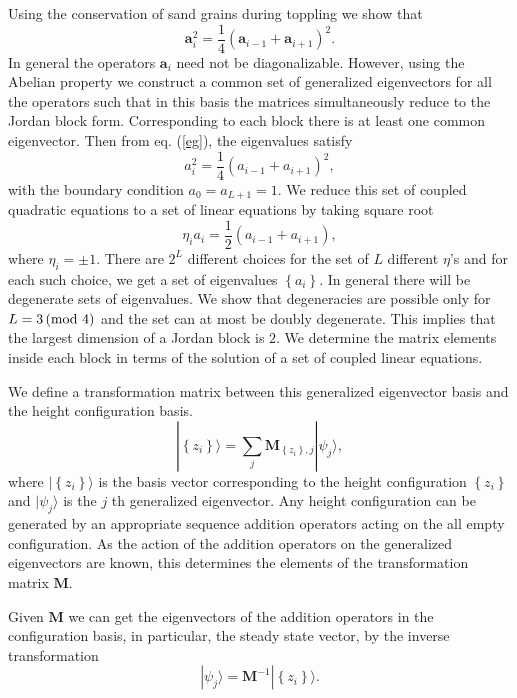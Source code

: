 \documentclass[11pt,a4paper]{book}
\begin{document}
Using the conservation of sand grains during toppling we show that
\begin{equation}
\mathbf{a}_{i}^{2}=\frac{1}{4}\left(
\mathbf{a}_{i-1}+\mathbf{a}_{i+1} \right)^{2}.
\label{eg}
\end{equation}
In general the operators $\mathbf{a}_{i}$ need not be diagonalizable.
However, using the Abelian property we construct a common set of
generalized eigenvectors for all the operators such that in this basis the
matrices simultaneously reduce to the Jordan block form. Corresponding to
each block there is at least one common eigenvector. Then from
eq. (\ref{eg}), the eigenvalues satisfy
\begin{equation}
a_{i}^{2}=\frac{1}{4}\left( a_{i-1} +
a_{i+1}\right)^{2},
\end{equation}
with the boundary condition $a_{0}=a_{L+1}=1$. We reduce this set of
coupled quadratic equations to a
set of linear equations by taking square root
\begin{equation}
\eta_{i}a_{i}=\frac{1}{2}\left( a_{i-1}+a_{i+1} \right),
\end{equation}
where $\eta_{i}=\pm 1$. There are $2^{L}$ different choices for the
set of $L$ different $\eta$'s and for each such choice, we get a set
of eigenvalues $\left\{ a_{i} \right\}$. In general there will be
degenerate sets of eigenvalues. We show that degeneracies are possible
only for $L= 3 \left(\rm{mod ~} 4 \right)$ and the set can at most be doubly
degenerate. This implies that the largest dimension of a Jordan
block is $2$. We determine the matrix elements inside each block in
terms of the solution of a set of coupled linear equations.

We define a transformation matrix between this generalized
eigenvector basis and the height configuration
basis.
\begin{equation}
|\left\{ z_{i} \right\}\rangle = \sum_{j} \mathbf{M}_{\left\{
z_{i}\right\},j} |\psi_{j}\rangle,
\end{equation}
where $|\left\{ z_{i} \right\}\rangle$ is the basis vector
corresponding to the height configuration $\left\{ z_{i} \right\}$ and
$|\psi_{j}\rangle$ is the $j$ th generalized eigenvector.
Any height configuration can be generated by an appropriate sequence
addition operators acting on the all empty configuration. As the action of the
addition operators on the generalized eigenvectors are known, this
determines the elements of the transformation matrix $\mathbf{M}$.

Given $\mathbf{M}$ we can get the eigenvectors of the addition
operators in the configuration basis, in particular, the steady state
vector, by the inverse transformation
\begin{equation}
|\psi_{j}\rangle=\mathbf{M}^{-1}|\left\{ z_{i} \right\}\rangle.
\end{equation}
\end{document}
